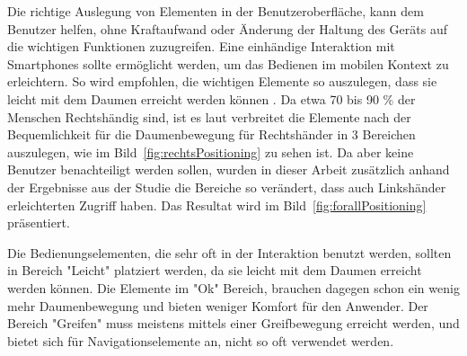 Die richtige Auslegung von Elementen in der Benutzeroberfläche, kann dem Benutzer helfen, ohne Kraftaufwand oder Änderung der Haltung des Geräts auf die wichtigen Funktionen zuzugreifen. Eine einhändige Interaktion mit Smartphones sollte ermöglicht werden, um das Bedienen im mobilen Kontext zu erleichtern. So wird empfohlen, die wichtigen Elemente so auszulegen, dass sie leicht mit dem Daumen erreicht werden können \cite[Seite 209]{mobileFrontier}. Da etwa 70 bis 90 $\%$ der Menschen Rechtshändig sind, ist es laut \cite[Seite 72]{mobileFirst} verbreitet die Elemente nach der Bequemlichkeit für die Daumenbewegung für Rechtshänder in 3 Bereichen auszulegen, wie im Bild~\ref{fig:rechtsPositioning} zu sehen ist. Da aber keine Benutzer benachteiligt werden sollen, wurden in dieser Arbeit zusätzlich anhand der Ergebnisse aus der Studie \cite{Park:2010tu} die Bereiche so verändert, dass auch Linkshänder erleichterten Zugriff haben. Das  Resultat wird im Bild~\ref{fig:forallPositioning}\cite[Seite 72]{mobileFirst} präsentiert.

Die Bedienungselementen, die sehr oft in der Interaktion benutzt werden, sollten in Bereich "Leicht" platziert werden, da sie leicht mit dem Daumen erreicht werden können. Die Elemente im "Ok" Bereich, brauchen dagegen schon ein wenig mehr Daumenbewegung und bieten weniger Komfort für den Anwender. Der Bereich "Greifen" muss meistens mittels einer Greifbewegung erreicht werden, und bietet sich für Navigationselemente an, nicht so oft verwendet werden.

